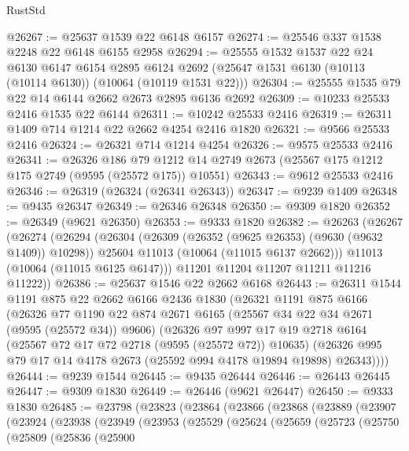 \begin{lexlean}{RustStd}
\begin{coremodule}
@26267 := @25637 @1539 @22 @6148 @6157
@26274 := @25546 @337 @1538 @2248 @22 @6148 @6155 @2958
@26294 := @25555
    @1532
    @1537
    @22
    @24
    @6130
    @6147
    @6154
    @2895
    @6124
    @2692
    (@25647 @1531 @6130 (@10113 (@10114 @6130)) (@10064 (@10119 @1531 @22)))
@26304 := @25555 @1535 @79 @22 @14 @6144 @2662 @2673 @2895 @6136 @2692
@26309 := @10233 @25533 @2416 @1535 @22 @6144
@26311 := @10242 @25533 @2416
@26319 := @26311 @1409 @714 @1214 @22 @2662 @4254 @2416 @1820
@26321 := @9566 @25533 @2416
@26324 := @26321 @714 @1214 @4254
@26326 := @9575 @25533 @2416
@26341 := @26326
    @186
    @79
    @1212
    @14
    @2749
    @2673
    (@25567 @175 @1212 @175 @2749 (@9595 (@25572 @175)) @10551)
@26343 := @9612 @25533 @2416
@26346 := @26319 (@26324 (@26341 @26343))
@26347 := @9239 @1409
@26348 := @9435 @26347
@26349 := @26346 @26348
@26350 := @9309 @1820
@26352 := @26349 (@9621 @26350)
@26353 := @9333 @1820
@26382 := @26263
    (@26267
      (@26274
        (@26294
          (@26304
            (@26309 (@26352 (@9625 @26353) (@9630 (@9632 @1409)) @10298))
            @25604
            @11013
            (@10064 (@11015 @6137 @2662)))
          @11013
          (@10064 (@11015 @6125 @6147)))
        @11201
        @11204
        @11207
        @11211
        @11216
        @11222))
@26386 := @25637 @1546 @22 @2662 @6168
@26443 := @26311
    @1544
    @1191
    @875
    @22
    @2662
    @6166
    @2436
    @1830
    (@26321
      @1191
      @875
      @6166
      (@26326
        @77
        @1190
        @22
        @874
        @2671
        @6165
        (@25567 @34 @22 @34 @2671 (@9595 (@25572 @34)) @9606)
        (@26326
          @97
          @997
          @17
          @19
          @2718
          @6164
          (@25567 @72 @17 @72 @2718 (@9595 (@25572 @72)) @10635)
          (@26326 @995 @79 @17 @14 @4178 @2673 (@25592 @994 @4178 @19894 @19898) @26343))))
@26444 := @9239 @1544
@26445 := @9435 @26444
@26446 := @26443 @26445
@26447 := @9309 @1830
@26449 := @26446 (@9621 @26447)
@26450 := @9333 @1830
@26485 := @23798
    (@23823
      (@23864
        (@23866
          (@23868
            (@23889
              (@23907
                (@23924
                  (@23938
                    (@23949
                      (@23953
                        (@25529
                          (@25624
                            (@25659
                              (@25723
                                (@25750
                                  (@25809
                                    (@25836
                                      (@25900

\end{coremodule}
\end{lexlean}
